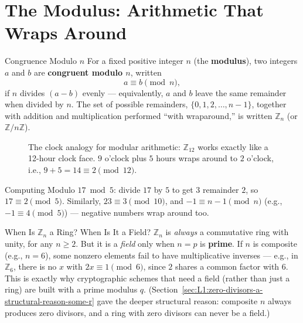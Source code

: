 \section{The Modulus: Arithmetic That Wraps Around}
\label{sec:L1:the-modulus-arithmetic-that-wraps-around}

\begin{defbox}{Congruence Modulo $n$}
For a fixed positive integer $n$ (the \textbf{modulus}), two integers $a$ and $b$ are \textbf{congruent modulo $n$}, written
$$a \equiv b \pmod{n},$$
if $n$ divides $(a-b)$ evenly --- equivalently, $a$ and $b$ leave the same remainder when divided by $n$. The set of possible remainders, $\{0, 1, 2, \ldots, n-1\}$, together with addition and multiplication performed ``with wraparound,'' is written $\mathbb{Z}_n$ (or $\mathbb{Z}/n\mathbb{Z}$).
\end{defbox}

\begin{figure}[h]
\centering
{}
\caption{The clock analogy for modular arithmetic: $\mathbb{Z}_{12}$ works exactly like a 12-hour clock face. $9$ o'clock plus $5$ hours wraps around to $2$ o'clock, i.e., $9+5=14 \equiv 2 \pmod{12}$.}
\label{fig:clock}
\end{figure}

\begin{exbox}{Computing Modulo}
$17 \bmod 5$: divide $17$ by $5$ to get $3$ remainder $2$, so $17 \equiv 2 \pmod 5$. Similarly, $23 \equiv 3 \pmod{10}$, and $-1 \equiv n-1 \pmod n$ (e.g., $-1 \equiv 4 \pmod 5$) --- negative numbers wrap around too.
\end{exbox}

\begin{rmkbox}{When Is $\mathbb{Z}_n$ a Ring? When Is It a Field?}
$\mathbb{Z}_n$ is \emph{always} a commutative ring with unity, for any $n \geq 2$. But it is a \emph{field} only when $n = p$ is \textbf{prime}. If $n$ is composite (e.g., $n=6$), some nonzero elements fail to have multiplicative inverses --- e.g., in $\mathbb{Z}_6$, there is no $x$ with $2x \equiv 1 \pmod 6$, since $2$ shares a common factor with $6$. This is exactly why cryptographic schemes that need a field (rather than just a ring) are built with a prime modulus $q$. (Section~\ref{sec:L1:zero-divisors-a-structural-reason-some-r} gave the deeper structural reason: composite $n$ always produces zero divisors, and a ring with zero divisors can never be a field.)
\end{rmkbox}

